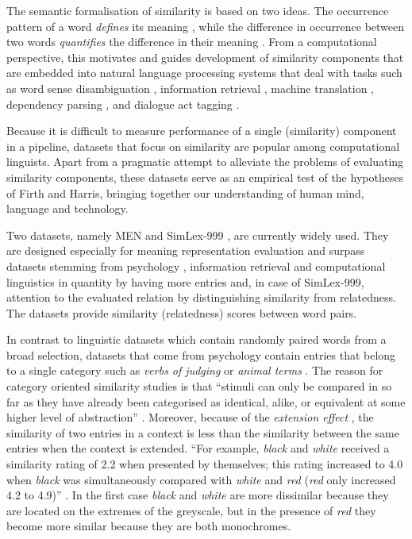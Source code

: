 \documentclass[11pt]{article}
\begin{document}
The semantic formalisation of similarity is based on two ideas. The occurrence pattern of a word \emph{defines} its meaning \cite{firth1957lingtheory}, while the difference in occurrence between two words \emph{quantifies} the difference in their meaning \cite{harris1954distributional}. From a computational perspective, this motivates and guides development of similarity components that are embedded into natural language processing systems that deal with tasks such as
word sense disambiguation \cite{Schutze:1998:AWS:972719.972724},
information retrieval \cite{Salton:1975:VSM:361219.361220,Milajevs:2015:IMN:2808194.2809448},
machine translation \cite{Dagan:1993:CWS:981574.981596},
dependency parsing \cite{hermann-blunsom:2013:ACL2013,andreas-klein:2014:P14-2},
and dialogue act tagging \cite{kalchbrenner-blunsom:2013:CVSC,milajevs-purver:2014:CVSC}.

Because it is difficult to measure performance of a single (similarity) component in a pipeline, datasets that focus on similarity are popular among computational linguists. Apart from a pragmatic attempt to alleviate the problems of evaluating similarity components, these datasets serve as an empirical test of the hypotheses of Firth and Harris, bringing together our understanding of human mind, language and technology.

Two datasets, namely MEN \cite{Bruni:2012:DST:2390524.2390544} and SimLex-999 \cite{hill2014simlex}, are currently widely used. They are designed especially for meaning representation evaluation and surpass datasets stemming from psychology \cite{1986-13502-00119860101}, information retrieval \cite{2002:PSC:503104.503110} and computational linguistics \cite{Rubenstein:1965:CCS:365628.365657} in quantity by having more entries and, in case of SimLex-999, attention to the evaluated relation by distinguishing similarity from relatedness. The datasets provide similarity (relatedness) scores between word pairs.

In contrast to linguistic datasets which contain randomly paired words from a broad selection, datasets that come from psychology contain entries that belong to a single category such as \textit{verbs of judging} \cite{FILLENBAUM197454} or \textit{animal terms} \cite{HENLEY1969176}. The reason for category oriented similarity studies is that ``stimuli can only be compared in so far as they have already been categorised as identical, alike, or equivalent at some higher level of abstraction'' \cite{turner1987rediscovering}. Moreover, because of the \emph{extension effect} \cite{medin1993respects}, the similarity of two entries in a context is less than the similarity between the same entries when the context is extended. ``For example, \textit{black} and \textit{white} received a similarity rating of 2.2 when presented by themselves; this rating increased to 4.0 when \textit{black} was simultaneously compared with \textit{white} and \textit{red} (\textit{red} only increased 4.2 to 4.9)'' \cite{medin1993respects}. In the first case \textit{black} and \textit{white} are more dissimilar because they are located on the extremes of the greyscale, but in the presence of \textit{red} they become more similar because they are both monochromes.
\end{document}
